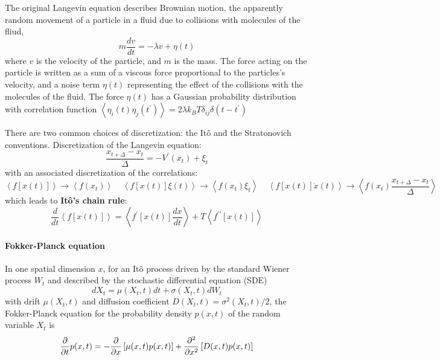 \documentclass[books,12pt]{elegantpaper}
\newcommand{\fives}{\ \ \ \ \ }
\newcommand{\pder}[2][]{\frac{\partial#1}{\partial#2}}
\newcommand{\parag}{\paragraph}
\newcommand{\llang}{\left\langle}
\newcommand{\rrang}{\right\rangle}
\begin{document}
The original Langevin equation describes Brownian motion, the apparently random movement of a particle in a fluid due to collisions with molecules of the fliud, 
$$ m \frac{dv}{dt} = - \lambda v + \eta(t) $$
where $v$ is the velocity of the particle, and $m$ is the mass. The force acting on the particle is written as a sum of a viscous force proportional to the particles's velocity, and a noise term $\eta(t)$ representing the effect of the collisions with the molecules of the fluid. The force $\eta(t)$ has a Gaussian probability distribution with correlation function $ \llang \eta_i(t) \eta_j(t^\prime) \rrang = 2 \lambda k_B T \delta_{ij} \delta(t-t^\prime)$

There are two common choices of discretization: the Itô and the Stratonovich conventions. Discretization of the Langevin equation:
$$ \frac{x_{t+\Delta} - x_t}{\Delta} = -V^\prime(x_t) + \xi_t $$
with an associated discretization of the correlations:
$$ \llang f\left[x(t)\right] \rrang \to \llang f(x_t) \rrang \fives \llang f\left[x(t)\right] \xi(t) \rrang \to \llang f(x_t)\xi_t \rrang \fives \llang f\left[x(t)\right] \dot{x}(t) \rrang \to \llang f(x_t) \frac{x_{t+\Delta} - x_t}{\Delta} \rrang $$
which leads to \textbf{Itô's chain rule}:
$$ \frac{d}{dt} \llang f\left[x(t)\right] \rrang = \llang f^\prime\left[x(t)\right] \frac{dx}{dt} \rrang + T \llang f^{\prime\prime} \left[ x(t) \right] \rrang $$


\parag{Fokker-Planck equation} In one spatial dimension $x$, for an Itô process driven by the standard Wiener process $W_t$ and described by the stochastic differential equation (SDE)
$$ dX_t = \mu(X_t,t) dt + \sigma(X_t,t) dW_t $$
with drift $\mu(X_t,t)$ and diffusion coefficient $D(X_t,t) = \sigma^2(X_t,t)/2$, the Fokker-Planck equation for the probability density $p(x,t)$ of the random variable $X_t$ is
$$ \pder{t} p(x,t) = - \pder{x} \left[ \mu(x,t) p(x,t) \right] + \pdv[2]{}{x} \left[ D(x,t) p(x,t) \right] $$
\end{document}
